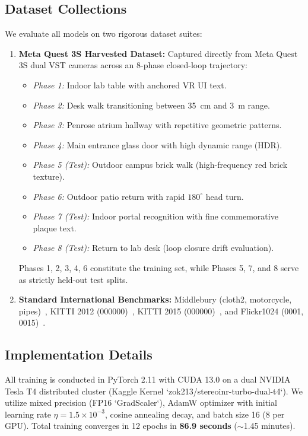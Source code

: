 \documentclass[conference]{IEEEtran}
\begin{document}
\subsection{Dataset Collections}
We evaluate all models on two rigorous dataset suites:
\begin{enumerate}
    \item \textbf{Meta Quest 3S Harvested Dataset:} Captured directly from Meta Quest 3S dual VST cameras across an 8-phase closed-loop trajectory:
    \begin{itemize}
        \item \textit{Phase 1:} Indoor lab table with anchored VR UI text.
        \item \textit{Phase 2:} Desk walk transitioning between 35~cm and 3~m range.
        \item \textit{Phase 3:} Penrose atrium hallway with repetitive geometric patterns.
        \item \textit{Phase 4:} Main entrance glass door with high dynamic range (HDR).
        \item \textit{Phase 5 (Test):} Outdoor campus brick walk (high-frequency red brick texture).
        \item \textit{Phase 6:} Outdoor patio return with rapid $180^\circ$ head turn.
        \item \textit{Phase 7 (Test):} Indoor portal recognition with fine commemorative plaque text.
        \item \textit{Phase 8 (Test):} Return to lab desk (loop closure drift evaluation).
    \end{itemize}
    Phases 1, 2, 3, 4, 6 constitute the training set, while Phases 5, 7, and 8 serve as strictly held-out test splits.
    \item \textbf{Standard International Benchmarks:} Middlebury (cloth2, motorcycle, pipes)~\cite{scharstein2014middlebury}, KITTI 2012 (000000)~\cite{geiger2013kitti}, KITTI 2015 (000000)~\cite{geiger2013kitti}, and Flickr1024 (0001, 0015)~\cite{wang2019passrnet}.
\end{enumerate}

\subsection{Implementation Details}
All training is conducted in PyTorch 2.11 with CUDA 13.0 on a dual NVIDIA Tesla T4 distributed cluster (Kaggle Kernel `zok213/stereoinr-turbo-dual-t4`). We utilize mixed precision (FP16 `GradScaler`), AdamW optimizer with initial learning rate $\eta = 1.5 \times 10^{-3}$, cosine annealing decay, and batch size 16 (8 per GPU). Total training converges in 12 epochs in \textbf{86.9 seconds} ($\sim$1.45 minutes).
\end{document}
